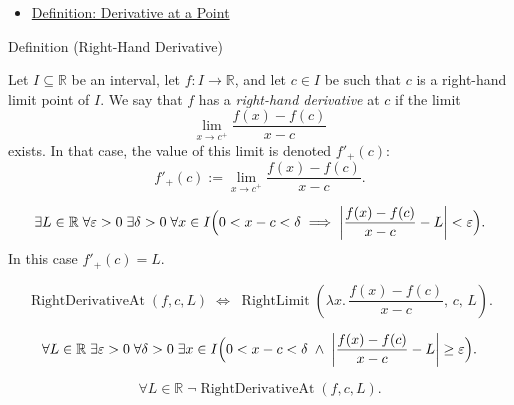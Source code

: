 \begin{remark*}[Dependencies]
\begin{itemize}
  \item \hyperref[def:derivative-at-a-point]{Definition: Derivative at a Point}
\end{itemize}
\end{remark*}


\begin{definitionbox}{Definition (Right-Hand Derivative)}
\begin{definition}
\label{def:right-hand-derivative}
Let $I \subseteq \mathbb{R}$ be an interval, let $f : I \to \mathbb{R}$, and let $c \in I$ be such that $c$ is a right-hand limit point of $I$. We say that $f$ has a \emph{right-hand derivative} at $c$ if the limit
\[
\lim_{x \to c^+} \frac{f(x) - f(c)}{x - c}
\]
exists. In that case, the value of this limit is denoted $f'_+(c)$:
\[
f'_+(c) := \lim_{x \to c^+} \frac{f(x) - f(c)}{x - c}.
\]
\end{definition}
\end{definitionbox}

\begin{remark*}
\[
\exists L \in \mathbb{R}\;\forall \varepsilon > 0\;\exists \delta > 0\;\forall x \in I
\Bigl(0 < x - c < \delta \implies \left|\frac{f(x)-f(c)}{x-c} - L\right| < \varepsilon\Bigr).
\]
In this case $f'_+(c) = L$.
\end{remark*}

\begin{remark*}
\[
\operatorname{RightDerivativeAt}(f, c, L)
\;\Longleftrightarrow\;
\operatorname{RightLimit}\!\left(\lambda x.\,\frac{f(x)-f(c)}{x-c},\, c,\, L\right).
\]
\end{remark*}

\begin{remark*}
\[
\forall L \in \mathbb{R}\;\exists \varepsilon > 0\;\forall \delta > 0\;\exists x \in I
\Bigl(0 < x - c < \delta \;\land\; \left|\frac{f(x)-f(c)}{x-c} - L\right| \ge \varepsilon\Bigr).
\]
\end{remark*}

\begin{remark*}
\[
\forall L \in \mathbb{R}\;\lnot\operatorname{RightDerivativeAt}(f, c, L).
\]
\end{remark*}

